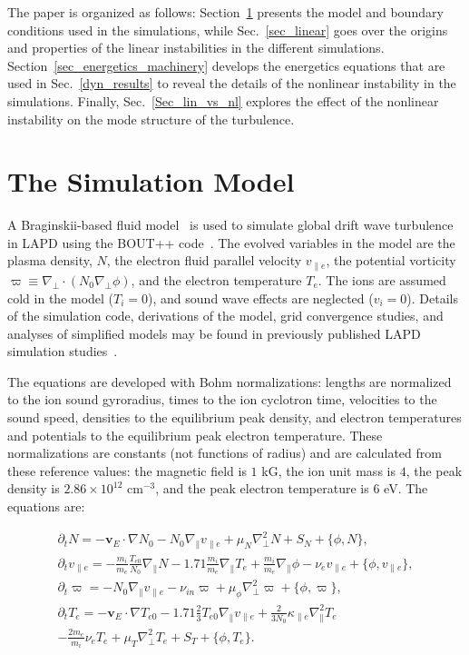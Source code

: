 \documentclass[showpacs,preprintnumbers,amsmath,amssymb,superscriptaddress,aip]{revtex4-1}
\def\beqar{\begin{eqnarray}}
\def\eeqar{\end{eqnarray}}
\newcommand{\pdt}{\partial_t}
\def\grad{\nabla}
\newcommand{\gradpar}{\grad_\parallel}
\newcommand{\gradperp}{\grad_\perp}
\newcommand{\vpe}{v_{\parallel e}}
\newcommand{\nue}{\nu_{e}}
\newcommand{\nuin}{\nu_{in}}
\newcommand{\kpe}{\kappa_{\parallel e}}
\newcommand{\fmie}{\frac{m_i}{m_e}}
\begin{document}
The paper is organized as follows: Section~\ref{dw_model} presents the model and boundary conditions used in the simulations, while 
Sec.~\ref{sec_linear} goes over the origins and properties of the linear instabilities in the different simulations.
Section~\ref{sec_energetics_machinery} develops the energetics equations that are used in Sec.~\ref{dyn_results} to reveal the details of the nonlinear instability in the simulations.
Finally, Sec.~\ref{Sec_lin_vs_nl} explores the effect of the nonlinear instability on the mode structure of the turbulence.



\section{The Simulation Model}
\label{dw_model}

A Braginskii-based fluid model~\cite{Braginskii1965} is used to simulate global drift wave turbulence in LAPD using the BOUT++ code~\cite{dudson2009}. 
The evolved variables in the model are the plasma density, $N$, the electron fluid parallel velocity $\vpe$, the potential vorticity $\varpi \equiv \gradperp \cdot (N_0 \gradperp \phi)$,
and the electron temperature $T_e$. The ions are assumed cold in the
model ($T_i = 0$), and sound wave effects are neglected ($v_i = 0$). Details of the simulation code, derivations of the model, grid convergence studies, and analyses of simplified models
may be found in previously published LAPD simulation studies~\cite{Popovich2010a,Popovich2010b,Umansky2011,friedman2012,friedman2012b}.

The equations are developed with Bohm normalizations: lengths are
normalized to the ion sound gyroradius, times to the ion
cyclotron time, velocities to the sound speed, densities to the equilibrium peak density, and electron
temperatures and potentials to the equilibrium peak electron temperature. These normalizations are constants (not functions of radius) and are calculated from these reference values:
the magnetic field is $1$ kG, the ion unit mass is $4$, the peak density is $2.86 \times 10^{12}$ cm$^{-3}$, and the peak electron temperature
is $6$ eV. The equations are:

\beqar
\label{ni_eq}
\pdt N = - {\mathbf v_E} \cdot \grad N_0 - N_0 \gradpar \vpe + \mu_N \gradperp^2 N + S_N + \{\phi,N\}, \\
\label{ve_eq}
\pdt \vpe = - \fmie \frac{T_{e0}}{N_0} \gradpar N - 1.71 \fmie \gradpar T_e  + \fmie \gradpar \phi - \nue \vpe + \{\phi,\vpe \}, \\
\label{rho_eq}
\pdt \varpi = - N_0 \gradpar \vpe  - \nuin \varpi + \mu_\phi \gradperp^2 \varpi + \{\phi,\varpi \}, \\
\label{te_eq}
\pdt T_e = - {\mathbf v_E} \cdot \grad T_{e0} - 1.71 \frac{2}{3} T_{e0} \gradpar \vpe + \frac{2}{3 N_0} \kpe \gradpar^2 T_e  \nonumber \\
- \frac{2 m_e}{m_i} \nue T_e  + \mu_T \gradperp^2 T_e +  S_T + \{\phi,T_e\}.
\eeqar
\end{document}
